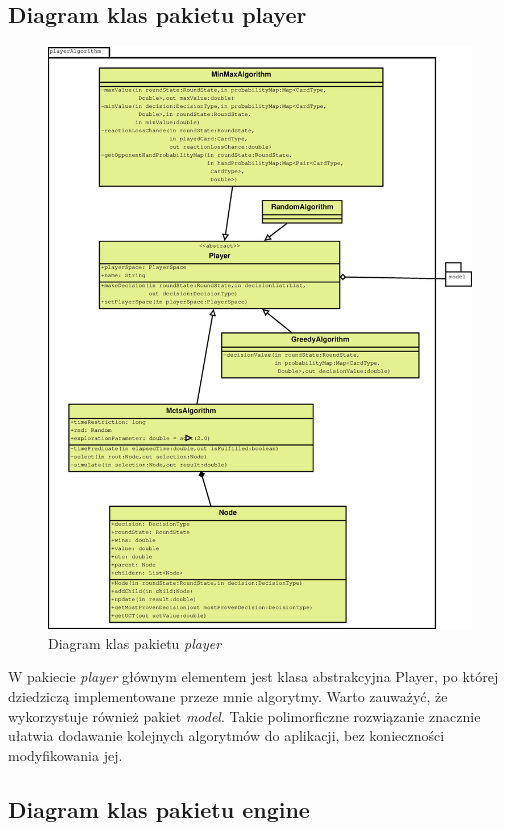 \subsection{Diagram klas pakietu player}

\begin{figure}[H]
	\centering
	\includegraphics[width=\textwidth]{Resources/diagramKlas_player.eps}
	\caption{Diagram klas pakietu \textit{player}} 
	\label{fig:diagramKlasPlayer}
\end{figure}

W pakiecie \textit{player} głównym elementem jest klasa abstrakcyjna Player, po której dziedziczą implementowane przeze mnie algorytmy. Warto zauważyć, że wykorzystuje również pakiet \textit{model}. Takie polimorficzne rozwiązanie znacznie ułatwia dodawanie kolejnych algorytmów do aplikacji, bez konieczności modyfikowania jej.

\subsection{Diagram klas pakietu engine}

